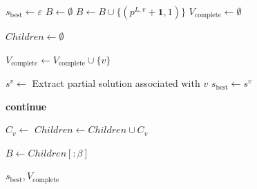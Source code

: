 \documentclass[runningheads]{llncs}
\begin{document}
 \begin{algorithm}[H]
 	\caption{Rooted Beam Search}
 	\label{alg:bs}
 	\begin{algorithmic}[1]
 		
 		
 		\State $s_{\text{best}} \gets \varepsilon$
 		\State $B \gets \emptyset$ 
 		 
 		\State $B \gets B \cup \{ (p^{L,v}+\textbf{1}, 1) \}$
 		\EndFor
 		\State $V_{\text{complete}} \gets \emptyset$
 		
 		\State $Children \gets \emptyset$
 		
 		\State $V_{\text{complete}} \gets V_{\text{complete}} \cup \{v\}$
 		
 		\State $s^v \gets$ Extract partial solution associated with $v$
 		\State $s_{\text{best}} \gets s^v$
 		\EndIf
 		
 		\State \textbf{continue}
 		\EndIf
 		
 		\State $C_v \gets$ 
 		\State $Children \gets Children \cup C_v$
 		\EndFor
 		
 		\State {} 
 		\State $B \gets Children[ \colon \beta]$
 		\EndWhile
 		
 		\State \Return $s_{\text{best}}, V_{\text{complete}}$
 		\EndFunction
 	\end{algorithmic}
 \end{algorithm}
 
\end{document}
